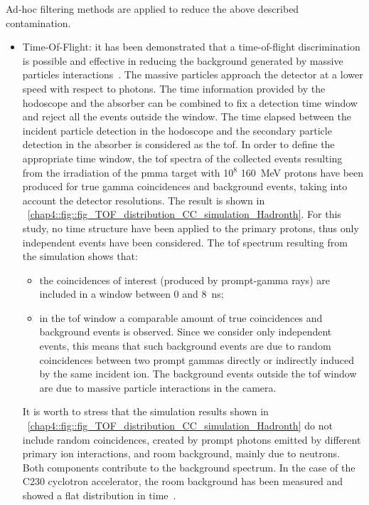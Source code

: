 Ad-hoc filtering methods are applied to reduce the above described contamination.

\begin{itemize}
\item Time-Of-Flight: it has been demonstrated that a time-of-flight discrimination is possible and effective in reducing the background generated by massive particles interactions~\parencite{Testa2010}. The massive particles approach the detector at a lower speed with respect to photons. The time information provided by the hodoscope and the absorber can be combined to fix a detection time window and reject all the events outside the window. The time elapsed between the incident particle detection in the hodoscope and the secondary particle detection in the absorber is considered as the \gls{tof}. In order to define the appropriate time window, the \gls{tof} spectra of the collected events resulting from the irradiation of the \gls{pmma} target with 10$^{8}$ 160~MeV protons have been produced for true gamma coincidences and background events, taking into account the detector resolutions. The result is shown in \figurename~\ref{chap4::fig::fig_TOF_distribution_CC_simulation_Hadronth}. For this study, no time structure have been applied to the primary protons, thus only independent events have been considered. The \gls{tof} spectrum resulting from the simulation shows that:
\begin{itemize}
\item the coincidences of interest (produced by prompt-gamma rays) are included in a window between 0 and 8~ns;
\item in the \gls{tof} window a comparable amount of true coincidences and background events is observed. Since we consider only independent events, this means that such background events are due to random coincidences between two prompt gammas directly or indirectly induced by the same incident ion. The background events outside the \gls{tof} window are due to massive particle interactions in the camera.
\end{itemize}
It is worth to stress that the simulation results shown in \figurename~\ref{chap4::fig::fig_TOF_distribution_CC_simulation_Hadronth} do not include random coincidences, created by prompt photons emitted by different primary ion interactions, and room background, mainly due to neutrons. Both components contribute to the background spectrum. In the case of the C230 cyclotron accelerator, the room background has been measured and showed a flat distribution in time~\parencite{Pinto2014}.


\end{itemize}
